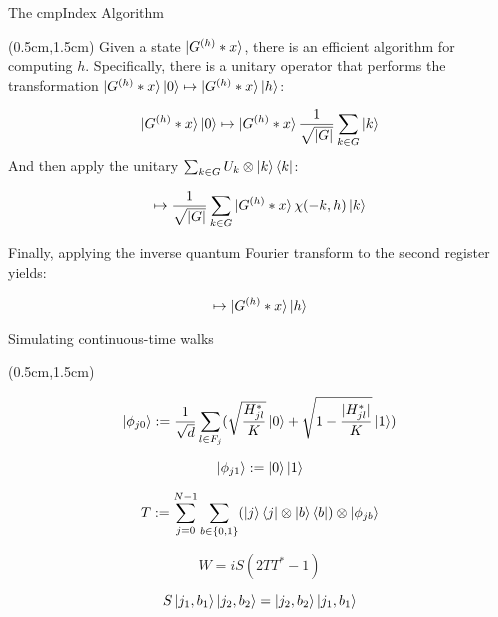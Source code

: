 \documentclass{beamer}
\theoremstyle{definition}
\begin{document}
\begin{frame}{The cmpIndex Algorithm}
    
    \begin{textblock*}{12cm}(0.5cm,1.5cm)
        Given a state $\ket{G^{(h)} * x}$, there is an efficient algorithm for computing $h$.
        Specifically, there is a unitary operator that performs the transformation $\ket{G^{(h)} * x} \ket{0} \mapsto \ket{G^{(h)} * x} \ket{h}$:

        \[
        \ket{G^{(h)} * x}\ket{0} \mapsto \ket{G^{(h)} * x} \frac{1}{\sqrt{|G|}}\sum_{k \in G}\ket{k}
        \]
        And then apply the unitary $\sum_{k \in G}U_k \otimes \ket{k}\bra{k}$:

        \[
        \mapsto \frac{1}{\sqrt{|G|}}\sum_{k \in G}\ket{G^{(h)}*x}\chi(-k,h)\ket{k}
        \]

       
        Finally, applying the inverse quantum Fourier transform to the second register yields:
       

        \[
           \mapsto  \ket{G^{(h)}*x}\ket{h}
        \]
    \end{textblock*}

\end{frame}





\begin{frame}{Simulating continuous-time walks}
    
    \begin{textblock*}{12cm}(0.5cm,1.5cm)
      
        \[
        \ket{\phi_{j0}} := \frac{1}{\sqrt{d}}\sum_{l \in F_j}(\sqrt{\frac{H^*_{jl}}{K}}\ket{0} + \sqrt{1-\frac{|H^*_{jl}|}{K}}\ket{1})
        \]

        \[
        \ket{\phi_{j1}} := \ket{0}\ket{1}
        \]

        \[
        T := \sum_{j=0}^{N-1}\sum_{b \in {\{0,1\}}}(\ket{j}\bra{j}\otimes\ket{b}\bra{b})\otimes\ket{\phi_{jb}}
        \]

        \[
        W = iS(2TT^* - 1)
        \]

        \[
        S\ket{j_1,b_1}\ket{j_2,b_2} = \ket{j_2,b_2}\ket{j_1,b_1}
        \]



    \end{textblock*}

\end{frame}
\end{document}
